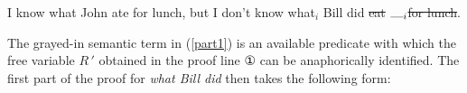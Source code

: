 \documentclass[output=paper,colorlinks,citecolor=brown]{langscibook}
\begin{document}
\begin{exe}
 \ex\label{extractionVPE-rep}
  I know what John ate for lunch,  but I don't know what\ensuremath{_i} Bill did
  \sout{eat}  {\ensuremath{\gp_i}}\xspace \sout{for lunch}.
\end{exe}
\begin{exe}
 \ex\label{part1}
\end{exe}

\noindent The grayed-in semantic term in (\ref{part1}) is an available predicate
with which the free variable $R\,'$ obtained in the proof line ①
can be anaphorically identified. The first part of the proof for \textit{what
Bill did} then takes the following form:
\end{document}
